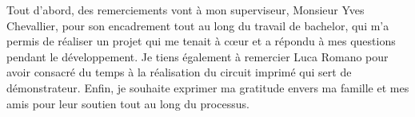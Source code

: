 Tout d'abord, des remerciements vont à mon superviseur, Monsieur Yves Chevallier, pour son encadrement tout au long du travail de bachelor, qui m'a permis de réaliser un projet qui me tenait à c\oe{}ur et a répondu à mes questions pendant le développement.
Je tiens également à remercier Luca Romano pour avoir consacré du temps à la réalisation du circuit imprimé qui sert de démonstrateur.
Enfin, je souhaite exprimer ma gratitude envers ma famille et mes amis pour leur soutien tout au long du processus.